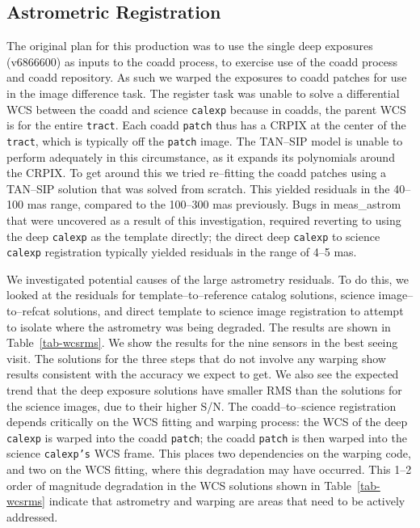 \documentclass[prd, nofootinbib, floatfix, 11pt,tightenlines,times]{article}
\begin{document}
\subsection{Astrometric Registration \label{subsec-astrom}}
The original plan for this production was to use the single deep
exposures (v6866600) as inputs to the coadd process, to exercise use
of the coadd process and coadd repository.  As such we warped the
exposures to coadd patches for use in the image difference task.  The
register task was unable to solve a differential WCS between the coadd
and science {\tt calexp} because in coadds, the parent WCS is for the
entire {\tt tract}.  Each coadd {\tt patch} thus has a CRPIX at the
center of the {\tt tract}, which is typically off the {\tt patch}
image.  The TAN--SIP model is unable to perform adequately in this
circumstance, as it expands its polynomials around the CRPIX.  To get
around this we tried re--fitting the coadd patches using a TAN--SIP
solution that was solved from scratch.  This yielded residuals in the
40--100 mas range, compared to the 100--300 mas previously.  Bugs in
meas\_astrom that were uncovered as a result of this investigation,
required reverting to using the deep {\tt calexp} as the template
directly; the direct deep {\tt calexp} to science {\tt calexp}
registration typically yielded residuals in the range of 4--5 mas.

We investigated potential causes of the large astrometry residuals.  To do this, we looked at the 
residuals for template--to--reference catalog solutions, science image--to--refcat solutions, and 
direct template to science image registration to attempt to isolate where the astrometry 
was being degraded.  The results are shown
in Table~\ref{tab-wcsrms}.  We show the results for the nine sensors in the best seeing visit.  
The solutions for the three steps that do not involve any warping show results consistent with 
the accuracy we expect to get.  We also see the expected trend that the deep exposure solutions have 
smaller RMS than the solutions for the science images, due to their higher S/N.  The coadd--to--science 
registration depends critically on the WCS fitting and warping process: the WCS of the deep {\tt calexp} is 
warped into the coadd {\tt patch}; the coadd {\tt patch} is then warped into the science {\tt calexp's} WCS
frame.  This places two dependencies on the warping code, and two on the WCS fitting, where
this degradation may have occurred.  This 1--2 order of magnitude degradation in the WCS solutions 
shown in Table~\ref{tab-wcsrms} indicate
that astrometry and warping are areas that need to be actively addressed.
\end{document}

